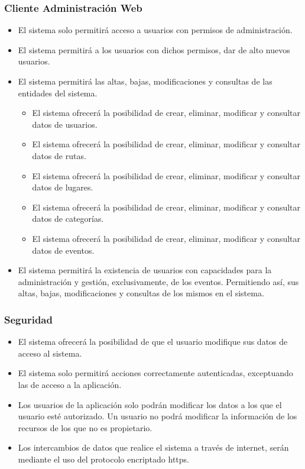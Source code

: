 \subsubsection*{Cliente Administración Web}
\begin{itemize}
\setlength\itemsep{1pt}
\item El sistema solo permitirá acceso a usuarios con permisos de administración.
\item El sistema permitirá a los usuarios con dichos permisos, dar de alto nuevos usuarios.
\item El sistema permitirá las altas, bajas, modificaciones y consultas de las entidades del sistema.
	\begin{itemize}
	\item El sistema ofrecerá la posibilidad de crear, eliminar, modificar y consultar datos de usuarios.
	\item El sistema ofrecerá la posibilidad de crear, eliminar, modificar y consultar datos de rutas.
	\item El sistema ofrecerá la posibilidad de crear, eliminar, modificar y consultar datos de lugares.
	\item El sistema ofrecerá la posibilidad de crear, eliminar, modificar y consultar datos de categorías.
	\item El sistema ofrecerá la posibilidad de crear, eliminar, modificar y consultar datos de eventos.
	\end{itemize}
\item El sistema permitirá la existencia de usuarios con capacidades para la administración y gestión, exclusivamente, de los eventos. Permitiendo así, sus altas,  bajas, modificaciones y consultas de los mismos en el sistema.
\end{itemize}

\subsubsection*{Seguridad}
\begin{itemize}
\setlength\itemsep{1pt}
\item El sistema ofrecerá la posibilidad de que el usuario modifique sus datos de acceso al sistema.
\item El sistema solo permitirá acciones correctamente autenticadas, exceptuando las de acceso a la aplicación.
\item Los usuarios de la aplicación solo podrán modificar los datos a los que el usuario esté autorizado. Un usuario no podrá modificar la información de los recursos de los que no es propietario.
\item Los intercambios de datos que realice el sistema a través de internet, serán mediante el uso del protocolo encriptado https.
\end{itemize}


